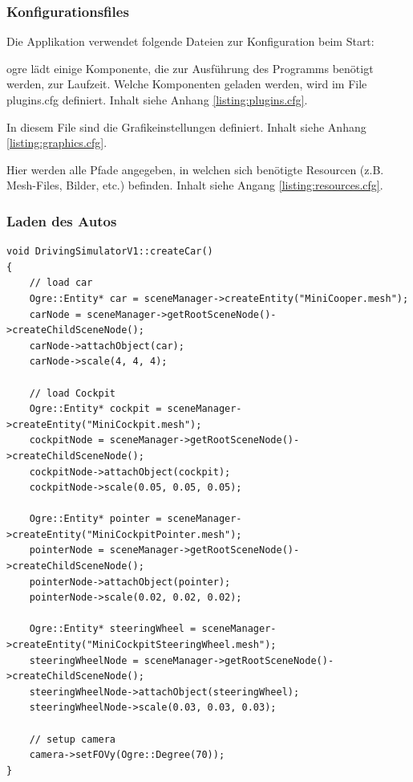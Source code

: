 \subsubsection{Konfigurationsfiles}
\label{sec:konfigurationsfiles}

Die Applikation verwendet folgende Dateien zur Konfiguration beim Start:

\gls{ogre} lädt einige Komponente, die zur Ausführung des Programms benötigt werden, zur Laufzeit. Welche Komponenten geladen werden, wird im File plugins.cfg definiert. Inhalt siehe Anhang \ref{listing:plugins.cfg}.

In diesem File sind die Grafikeinstellungen definiert. Inhalt siehe Anhang \ref{listing:graphics.cfg}.

Hier werden alle Pfade angegeben, in welchen sich benötigte Resourcen (z.B. Mesh-Files, Bilder, etc.) befinden. Inhalt siehe Angang \ref{listing:resources.cfg}.

\subsubsection{Laden des Autos}

\begin{lstlisting}[caption={Laden des Autos},label={laden_auto}]
void DrivingSimulatorV1::createCar()
{
	// load car
	Ogre::Entity* car = sceneManager->createEntity("MiniCooper.mesh");
	carNode = sceneManager->getRootSceneNode()->createChildSceneNode();
	carNode->attachObject(car);
	carNode->scale(4, 4, 4);

	// load Cockpit
	Ogre::Entity* cockpit = sceneManager->createEntity("MiniCockpit.mesh");
	cockpitNode = sceneManager->getRootSceneNode()->createChildSceneNode();
	cockpitNode->attachObject(cockpit);
	cockpitNode->scale(0.05, 0.05, 0.05);

	Ogre::Entity* pointer = sceneManager->createEntity("MiniCockpitPointer.mesh");
	pointerNode = sceneManager->getRootSceneNode()->createChildSceneNode();
	pointerNode->attachObject(pointer);
	pointerNode->scale(0.02, 0.02, 0.02);

	Ogre::Entity* steeringWheel = sceneManager->createEntity("MiniCockpitSteeringWheel.mesh");
	steeringWheelNode = sceneManager->getRootSceneNode()->createChildSceneNode();
	steeringWheelNode->attachObject(steeringWheel);
	steeringWheelNode->scale(0.03, 0.03, 0.03);

	// setup camera
	camera->setFOVy(Ogre::Degree(70));
}
\end{lstlisting}

